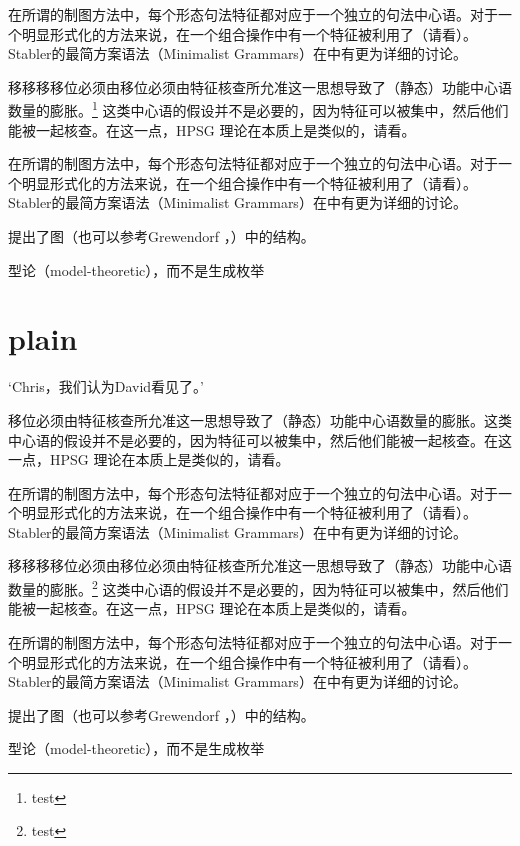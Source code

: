\documentclass{scrbook}
\let\citew\citealp
\newcommand{\page}{}
\begin{document}
在所谓的制图方法中，每个形态句法特征都对应于一个独立的句法中心语\citep[\page 54, 61]{CR2010a}。对于一个明显形式化的方法来说，在一个组合操作中有一个特征被利用了（请看\citew[\page 335]{Stabler2001a}）。Stabler的最简方案语法（Minimalist Grammars）在中有更为详细的讨论。

移移移移位必须由移位必须由特征核查所允准这一思想导致了（静态）功能中心语数量的膨胀。\footnote{test} 这类中心语的假设并不是必要的，因为特征可以被集中，然后他们能被一起核查。在这一点，HPSG 理论在本质上是类似的，请看\citew[\S~II.3.3.4, \S~II.4.2]{Sternefeld2006a-u}。

在所谓的制图方法中，每个形态句法特征都对应于一个独立的句法中心语\citep[\page 54, 61]{CR2010a}。对于一个明显形式化的方法来说，在一个组合操作中有一个特征被利用了（请看\citew[\page 335]{Stabler2001a}）。Stabler的最简方案语法（Minimalist Grammars）在中有更为详细的讨论。

\citet[\page 297]{Rizzi97a-u}提出了图（也可以参考Grewendorf \citeyear[\page 85, 240]{Grewendorf2002a}，\citeyear{Grewendorf2009a}）中的结构。

型论（model-theoretic），而不是生成枚举

              
\section{plain}


    `Chris，我们认为David看见了。'

移位必须由特征核查所允准这一思想导致了（静态）功能中心语数量的膨胀。这类中心语的假设并不是必要的，因为特征可以被集中，然后他们能被一起核查。在这一点，HPSG 理论在本质上是类似的，请看\citew[\S~II.3.3.4, \S~II.4.2]{Sternefeld2006a-u}。

在所谓的制图方法中，每个形态句法特征都对应于一个独立的句法中心语\citep[\page 54, 61]{CR2010a}。对于一个明显形式化的方法来说，在一个组合操作中有一个特征被利用了（请看\citew[\page 335]{Stabler2001a}）。Stabler的最简方案语法（Minimalist Grammars）在中有更为详细的讨论。

移移移移位必须由移位必须由特征核查所允准这一思想导致了（静态）功能中心语数量的膨胀。\footnote{test} 这类中心语的假设并不是必要的，因为特征可以被集中，然后他们能被一起核查。在这一点，HPSG 理论在本质上是类似的，请看\citew[\S~II.3.3.4, \S~II.4.2]{Sternefeld2006a-u}。

在所谓的制图方法中，每个形态句法特征都对应于一个独立的句法中心语\citep[\page 54, 61]{CR2010a}。对于一个明显形式化的方法来说，在一个组合操作中有一个特征被利用了（请看\citew[\page 335]{Stabler2001a}）。Stabler的最简方案语法（Minimalist Grammars）在中有更为详细的讨论。

\citet[\page 297]{Rizzi97a-u}提出了图（也可以参考Grewendorf \citeyear[\page 85, 240]{Grewendorf2002a}，\citeyear{Grewendorf2009a}）中的结构。

型论（model-theoretic），而不是生成枚举


 


    
\end{document}
